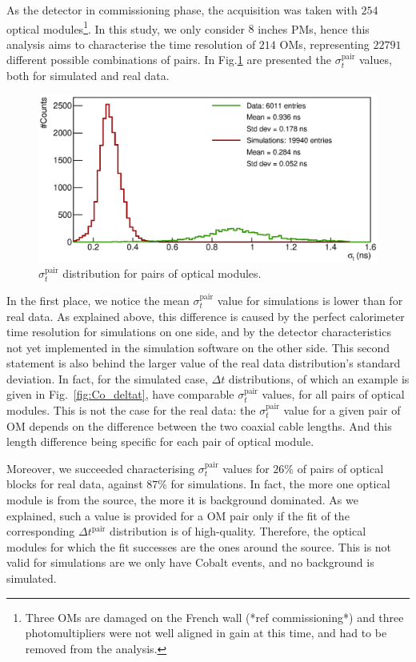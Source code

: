 As the detector in commissioning phase, the acquisition was taken with $254$ optical modules\footnote{Three OMs are damaged on the French wall (*ref commissioning*) and three photomultipliers were not well aligned in gain at this time, and had to be removed from the analysis.}.
In this study, we only consider $8$ inches PMs, hence this analysis aims to characterise the time resolution of $214$ OMs, representing $22791$ different possible combinations of pairs.
In Fig.\ref{fig:Co_corr_sigma} are presented the $\sigma_{t}^{\text{pair}}$ values, both for simulated and real data.
\begin{figure}[h]
  \centering
  \includegraphics[width=15cm]{commissioning/fig_commissioning/Co_corr_sigma.eps}
  \caption{$\sigma_{t}^{\text{pair}}$ distribution for pairs of optical modules.
    \label{fig:Co_corr_sigma}}
\end{figure}
In the first place, we notice the mean $\sigma_{t}^{\text{pair}}$ value for simulations is lower than for real data.
As explained above, this difference is caused by the perfect calorimeter time resolution for simulations on one side, and by the detector characteristics not yet implemented in the simulation software on the other side.
This second statement is also behind the larger value of the real data distribution's standard deviation.
In fact, for the simulated case, $\Delta{t}$ distributions, of which an example is given in Fig.~\ref{fig:Co_deltat}, have comparable $\sigma_{t}^{\text{pair}}$ values, for all pairs of optical modules.
This is not the case for the real data: the $\sigma_{t}^{\text{pair}}$ value for a given pair of OM depends on the difference between the two coaxial cable lengths.
And this length difference being specific for each pair of optical module.

Moreover, we succeeded characterising $\sigma_{t}^{\text{pair}}$ values for $26$\% of pairs of optical blocks for real data, against $87$\% for simulations.
In fact, the more one optical module is from the source, the more it is background dominated.
As we explained, such a value is provided for a OM pair only if the fit of the corresponding $\Delta t^{\text{pair}}$ distribution is of high-quality.
Therefore, the optical modules for which the fit successes are the ones around the source.
This is not valid for simulations are we only have Cobalt events, and no background is simulated.

